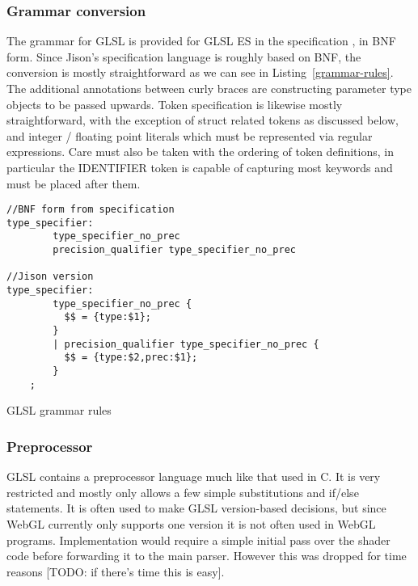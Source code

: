\documentclass[12pt,twoside,notitlepage]{report}
\begin{document}
\subsubsection{Grammar conversion}
The grammar for GLSL is provided for GLSL ES in the specification \cite{glsl-spec}, in BNF form. Since Jison's specification language is roughly based on BNF, the conversion is mostly straightforward as we can see in Listing~\ref{grammar-rules}. The additional annotations between curly braces are constructing parameter type objects to be passed upwards. Token specification is likewise mostly straightforward, with the exception of struct related tokens as discussed below, and integer / floating point literals which must be represented via regular expressions. Care must also be taken with the ordering of token definitions, in particular the IDENTIFIER token is capable of capturing most keywords and must be placed after them.
\begin{listing}
\label{grammar-rules}
\begin{verbatim}
//BNF form from specification
type_specifier:
        type_specifier_no_prec
        precision_qualifier type_specifier_no_prec

//Jison version
type_specifier:
        type_specifier_no_prec { 
          $$ = {type:$1}; 
        }
        | precision_qualifier type_specifier_no_prec { 
          $$ = {type:$2,prec:$1}; 
        }
	;
\end{verbatim}
\caption{GLSL grammar rules}
\end{listing}

\subsubsection{Preprocessor}
GLSL contains a preprocessor language much like that used in C. It is very restricted and mostly only allows a few simple substitutions and if/else statements. It is often used to make GLSL version-based decisions, but since WebGL currently only supports one version it is not often used in WebGL programs. Implementation would require a simple initial pass over the shader code before forwarding it to the main parser. However this was dropped for time reasons [TODO: if there's time this is easy].
\end{document}
